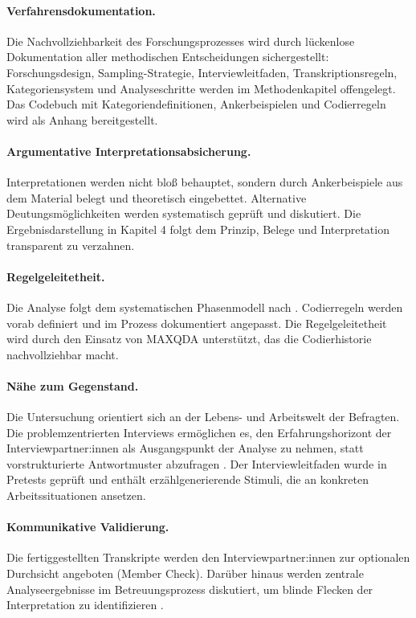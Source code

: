 \paragraph{Verfahrensdokumentation.} Die Nachvollziehbarkeit des Forschungsprozesses wird durch lückenlose Dokumentation aller methodischen Entscheidungen sichergestellt: Forschungsdesign, Sampling-Strategie, Interviewleitfaden, Transkriptionsregeln, Kategoriensystem und Analyseschritte werden im Methodenkapitel offengelegt. Das Codebuch mit Kategoriendefinitionen, Ankerbeispielen und Codierregeln wird als Anhang bereitgestellt.

\paragraph{Argumentative Interpretationsabsicherung.} Interpretationen werden nicht bloß behauptet, sondern durch Ankerbeispiele aus dem Material belegt und theoretisch eingebettet. Alternative Deutungsmöglichkeiten werden systematisch geprüft und diskutiert. Die Ergebnisdarstellung in Kapitel 4 folgt dem Prinzip, Belege und Interpretation transparent zu verzahnen.

\paragraph{Regelgeleitetheit.} Die Analyse folgt dem systematischen Phasenmodell nach \textcite{kuckartzQualitativeInhaltsanalyseMethoden2018}. Codierregeln werden vorab definiert und im Prozess dokumentiert angepasst. Die Regelgeleitetheit wird durch den Einsatz von MAXQDA unterstützt, das die Codierhistorie nachvollziehbar macht.

\paragraph{Nähe zum Gegenstand.} Die Untersuchung orientiert sich an der Lebens- und Arbeitswelt der Befragten. Die problemzentrierten Interviews ermöglichen es, den Erfahrungshorizont der Interviewpartner:innen als Ausgangspunkt der Analyse zu nehmen, statt vorstrukturierte Antwortmuster abzufragen \parencite{witzelProblemcenteredInterview2000}. Der Interviewleitfaden wurde in Pretests geprüft und enthält erzählgenerierende Stimuli, die an konkreten Arbeitssituationen ansetzen.

\paragraph{Kommunikative Validierung.} Die fertiggestellten Transkripte werden den Interviewpartner:innen zur optionalen Durchsicht angeboten (Member Check). Darüber hinaus werden zentrale Analyseergebnisse im Betreuungsprozess diskutiert, um blinde Flecken der Interpretation zu identifizieren \parencite{flick2017}.

